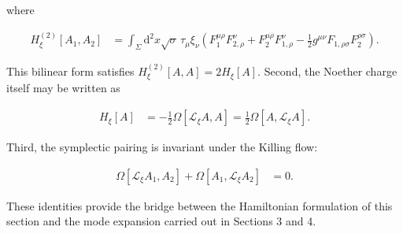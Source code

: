where

\begin{align}
H_{\xi}^{(2)}[A_{1},A_{2}]&=\int _{\Sigma}\mathrm{d}^{2}x\sqrt{ \sigma }\,\tau _{\mu}\xi _{\nu}\left(F_{1}^{\mu \rho}F_{2,\rho}^{\nu}+F_{2}^{\mu \rho}F_{1,\rho}^{\nu}-\frac{1}{2}g^{\mu \nu}F_{1,\rho \sigma}F_{2}^{\rho \sigma}\right).
\end{align}

This bilinear form satisfies $H_{\xi}^{(2)}[A,A]=2H_{\xi}[A]$. Second, the Noether charge itself may be written as

\begin{align}
H_{\xi}[A]&=-\frac{1}{2}\Omega[\mathcal{L}_{\xi}A,A]=\frac{1}{2}\Omega[A,\mathcal{L}_{\xi}A].
\end{align}

Third, the symplectic pairing is invariant under the Killing flow:

\begin{align}
\Omega[\mathcal{L}_{\xi}A_{1},A_{2}]+\Omega[A_{1},\mathcal{L}_{\xi}A_{2}]&=0.
\end{align}

These identities provide the bridge between the Hamiltonian formulation of this section and the mode expansion carried out in Sections 3 and 4.
